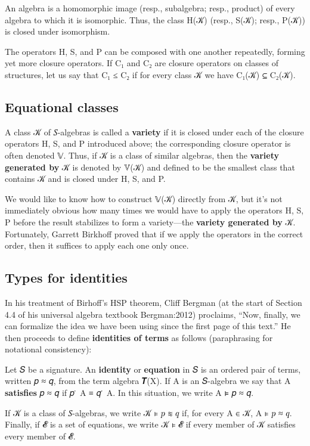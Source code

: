 \documentclass[sigplan,screen]{acmart}
\begin{document}
An algebra is a homomorphic image (resp., subalgebra; resp., product) of every algebra to which it is isomorphic. Thus, the class H(𝒦) (resp., S(𝒦); resp., P(𝒦)) is closed under isomorphism.

The operators H, S, and P can be composed with one another repeatedly, forming yet more closure operators. If C₁ and C₂ are closure operators on classes of structures, let us say that C₁ ≤ C₂ if for every class 𝒦 we have C₁(𝒦) ⊆ C₂(𝒦).

\subsection{Equational classes}\label{equational-classes}
A class 𝒦 of 𝑆-algebras is called a \textbf{variety} if it is closed under each of the closure operators H, S, and P introduced above; the corresponding closure operator is often denoted 𝕍. Thus, if 𝒦 is a class of similar algebras, then the \textbf{variety generated by} 𝒦 is denoted by 𝕍(𝒦) and defined to be the smallest class that contains 𝒦 and is closed under H, S, and P.

We would like to know how to construct 𝕍(𝒦) directly from 𝒦, but it's not immediately obvious how many times we would have to apply the operators H, S, P before the result stabilizes to form a variety---the \textbf{variety generated by} 𝒦. Fortunately, Garrett Birkhoff proved that if we apply the operators in the correct order, then it suffices to apply each one only once.

\subsection{Types for identities}\label{types-for-identities}
In his treatment of Birhoff's HSP theorem, Cliff Bergman (at the start of Section 4.4 of his universal algebra textbook Bergman:2012) proclaims, ``Now, finally, we can formalize the idea we have been using since the first page of this text.'' He then proceeds to define \textbf{identities of terms} as follows (paraphrasing for notational consistency):

Let 𝑆 be a signature. An \textbf{identity} or \textbf{equation} in 𝑆 is an ordered pair of terms, written 𝑝 ≈ 𝑞, from the term algebra 𝑻(X). If A is an 𝑆-algebra we say that A \textbf{satisfies} 𝑝 ≈ 𝑞 if 𝑝 ̇ A ≡ 𝑞 ̇ A. In this situation, we write A ⊧ 𝑝 ≈ 𝑞.

If 𝒦 is a class of 𝑆-algebras, we write 𝒦 ⊧ 𝑝 ≋ 𝑞 if, for every A ∈ 𝒦, A ⊧ 𝑝 ≈ 𝑞. Finally, if 𝓔 is a set of equations, we write 𝒦 ⊧ 𝓔 if every member of 𝒦 satisfies every member of 𝓔.
\end{document}
